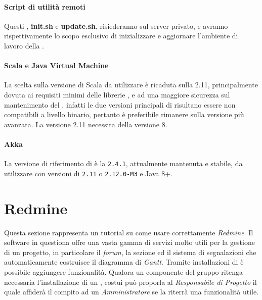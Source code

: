 \documentclass{scalatekids-article}
\begin{document}
\paragraph{Script di utilità remoti}

Questi , \textbf{init.sh} e \textbf{update.sh}, risiederanno sul server
privato, e avranno rispettivamente lo scopo esclusivo di inizializzare e
aggiornare l'ambiente di lavoro della .

\paragraph{Scala e Java Virtual Machine}

La scelta sulla versione di Scala da utilizzare è ricaduta sulla 
2.11, principalmente dovuta ai requisiti minimi delle librerie \textit{}, e
ad una maggiore sicurezza sul mantenimento del , infatti le due versioni
principali di  risultano essere non compatibili a livello binario,
pertanto è preferibile rimanere sulla versione più avanzata. La versione 2.11
necessita della  versione 8.

\paragraph{Akka}

La versione di riferimento di  è la \verb=2.4.1=, attualmente
mantenuta e stabile, da utilizzare con versioni di  \verb=2.11= o
\verb=2.12.0-M3= e Java 8+.

\newpage
\appendix

\section{Redmine}

\label{sec:redmine}
Questa sezione rappresenta un tutorial su come usare correttamente \textit{Redmine}. Il software in questiona offre una vasta gamma di servizi molto utili per la gestione di un progetto, in particolare il \textit{forum}, la sezione  ed il sistema di segnalazioni che automaticamente costruisce il diagramma di \textit{Gantt}. Tramite installazioni di  è possibile aggiungere funzionalità. Qualora un componente del gruppo ritenga necessaria l'installazione di un , costui può proporla al \textit{Responsabile di Progetto} il quale affiderà il compito ad un \textit{Amministratore} se la riterrà una funzionalità utile.
\end{document}
